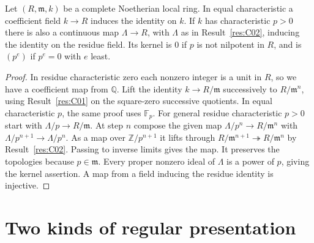 \begin{theorem}\label{res:C03}
Let \((R,\mathfrak m,k)\) be a complete Noetherian local ring.
In equal characteristic a coefficient field \(k\to R\) induces the
identity on \(k\). If \(k\) has characteristic \(p>0\) there is also
a continuous map \(\Lambda\to R\), with \(\Lambda\) as in
Result~\ref{res:C02}, inducing the identity on the residue field.
Its kernel is \(0\) if \(p\) is not nilpotent in \(R\), and is
\((p^e)\) if \(p^e=0\) with \(e\) least.
\end{theorem}
\begin{proof}
In residue characteristic zero each nonzero integer is a unit in
\(R\), so we have a coefficient map from \(\mathbb Q\).
Lift the identity \(k\to R/\mathfrak m\) successively to
\(R/\mathfrak m^n\), using Result~\ref{res:C01} on the square-zero
successive quotients. In equal characteristic \(p\), the same proof
uses \(\mathbb F_p\).
For general residue characteristic \(p>0\) start with
\(\Lambda/p\to R/\mathfrak m\). At step \(n\) compose the given map
\(\Lambda/p^n\to R/\mathfrak m^n\) with
\(\Lambda/p^{n+1}\to\Lambda/p^n\).
As a map over \(\mathbb Z/p^{n+1}\) it lifts through
\(R/\mathfrak m^{n+1}\twoheadrightarrow R/\mathfrak m^n\) by
Result~\ref{res:C02}. Passing to inverse limits gives the map.
It preserves the topologies because \(p\in\mathfrak m\). Every
proper nonzero ideal of \(\Lambda\) is a power of \(p\), giving the
kernel assertion. A map from a field inducing the residue identity
is injective.
\end{proof}

\section{Two kinds of regular presentation}

